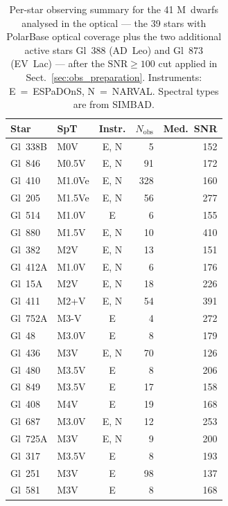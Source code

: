 
\begin{table}
\centering
\caption{Per-star observing summary for the 41 M~dwarfs analysed in the optical --- the 39 \citet{cristofari+2022b,cristofari_2023b} stars with PolarBase optical coverage plus the two additional active stars Gl~388 (AD~Leo) and Gl~873 (EV~Lac) --- after the $\mathrm{SNR}\geq100$ cut applied in Sect.~\ref{sec:obs_preparation}. Instruments: E~=~ESPaDOnS, N~=~NARVAL. Spectral types are from SIMBAD.}
\label{tab:obs_summary}
\footnotesize
\begin{tabular*}{\linewidth}{@{\extracolsep{\fill}} l l c r r}
\toprule
Star & SpT & Instr. & $N_{\mathrm{obs}}$ & Med.\ SNR \\
\midrule
Gl~338B        & M0V    & E, N & 5   & 152 \\
Gl~846         & M0.5V  & E, N & 91  & 172 \\
Gl~410         & M1.0Ve & E, N & 328 & 160 \\
Gl~205         & M1.5Ve & E, N & 56  & 277 \\
Gl~514         & M1.0V  & E    & 6   & 155 \\
Gl~880         & M1.5V  & E, N & 10  & 410 \\
Gl~382         & M2V    & E, N & 13  & 151 \\
Gl~412A        & M1.0V  & E, N & 6   & 176 \\
Gl~15A         & M2V    & E, N & 18  & 226 \\
Gl~411         & M2+V   & E, N & 54  & 391 \\
Gl~752A        & M3-V   & E    & 4   & 272 \\
Gl~48          & M3.0V  & E    & 8   & 179 \\
Gl~436         & M3V    & E, N & 70  & 126 \\
Gl~480         & M3.5V  & E    & 8   & 206 \\
Gl~849         & M3.5V  & E    & 17  & 158 \\
Gl~408         & M4V    & E    & 19  & 168 \\
Gl~687         & M3.0V  & E, N & 12  & 253 \\
Gl~725A        & M3V    & E, N & 9   & 200 \\
Gl~317         & M3.5V  & E    & 8   & 193 \\
Gl~251         & M3V    & E    & 98  & 137 \\
Gl~581         & M3V    & E    & 8   & 168 \\

\end{tabular*}
\end{table}
